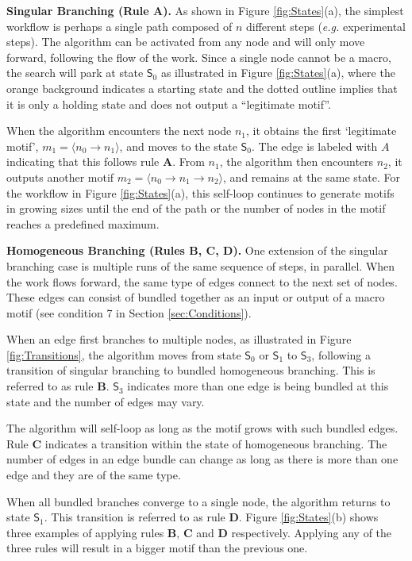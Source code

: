 \noindent \textbf{Singular Branching (Rule A).}
%
As shown in Figure \ref{fig:States}(a), the simplest workflow is perhaps a single path composed of $n$ different steps (\emph{e.g.} experimental steps).
The algorithm can be activated from any node and will only move forward, following the flow of the work.
Since a single node cannot be a macro, the search will park at state $\mathsf{S}_0$ as illustrated in Figure \ref{fig:States}(a), where the orange background indicates a starting state and the dotted outline implies that it is only a holding state and does not output a ``legitimate motif''.

When the algorithm encounters the next node $n_1$, it obtains the first `legitimate motif', $m_1 = \langle n_0 \rightarrow n_1 \rangle$, and moves to the state $\mathsf{S}_0$.
The edge is labeled with $A$ indicating that this follows rule \textbf{A}.
From $n_1$, the algorithm then encounters $n_2$, it outputs another motif $m_2 = \langle n_0 \rightarrow n_1 \rightarrow n_2 \rangle$, and remains at the same state.
For the workflow in Figure \ref{fig:States}(a), this self-loop continues to generate motifs in growing sizes until the end of the path or the number of nodes in the motif reaches a predefined maximum. 

\noindent \textbf{Homogeneous Branching (Rules B, C, D).}
%
One extension of the singular branching case is multiple runs of the same sequence of steps, in parallel.
When the work flows forward, the same type of edges connect to the next set of nodes. These edges can consist of bundled together as an input or output of a macro motif (see condition 7 in Section \ref{sec:Conditions}).

When an edge first branches to multiple nodes, as illustrated in Figure \ref{fig:Transitions}, the algorithm moves from state $\mathsf{S}_0$ or $\mathsf{S}_1$ to $\mathsf{S}_3$, following a transition of singular branching to bundled homogeneous branching.
This is referred to as rule \textbf{B}.
$\mathsf{S}_3$ indicates more than one edge is being bundled at this state and the number of edges may vary.

The algorithm will self-loop as long as the motif grows with such bundled edges.
Rule \textbf{C} indicates a transition within the state of homogeneous branching.
The number of edges in an edge bundle can change as long as there is more than one edge and they are of the same type.

When all bundled branches converge to a single node, the algorithm returns to state $\mathsf{S}_1$.
This transition is referred to as rule \textbf{D}.
Figure \ref{fig:States}(b) shows three examples of applying rules \textbf{B}, \textbf{C} and \textbf{D} respectively.
Applying any of the three rules will result in a bigger motif than the previous one.

